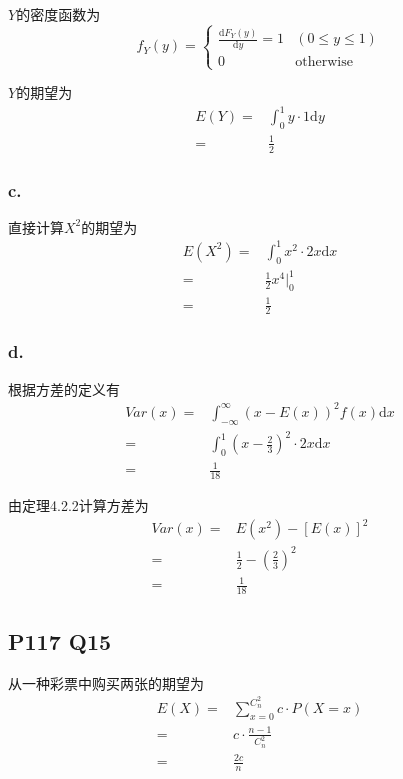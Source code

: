 \documentclass[a4paper,12pt]{ctexart}
\begin{document}
$Y$的密度函数为
\begin{equation*}
	f_Y(y) =
	\begin{cases}
		\frac{\mathrm{d}F_Y(y)}{\mathrm{d}y} = 1 & (0 \leq y \leq 1) \\
		0 & \text{otherwise}
	\end{cases}
\end{equation*}

$Y$的期望为
\begin{align*}
	E(Y) =& \int_{0}^{1} y \cdot 1 \mathrm{d}y \\
	=& \frac{1}{2}
\end{align*}

\subsubsection*{c.}

直接计算$X^2$的期望为
\begin{align*}
	E(X^2) =& \int_{0}^{1} x^2 \cdot 2x \mathrm{d}x \\
	=& \frac{1}{2} x^4 \bigg|_0^1 \\
	=& \frac{1}{2}
\end{align*}

\subsubsection*{d.}

根据方差的定义有
\begin{align*}
	Var(x) =& \int_{-\infty}^{\infty} (x - E(x))^2 f(x) \mathrm{d}x \\
	=& \int_{0}^{1} \left(x - \frac{2}{3}\right)^2 \cdot 2x \mathrm{d}x \\
	=& \frac{1}{18}
\end{align*}

由定理4.2.2计算方差为
\begin{align*}
	Var(x) =& E(x^2) - [E(x)]^2 \\
	=& \frac{1}{2} - \left(\frac{2}{3}\right)^2 \\
	=& \frac{1}{18}
\end{align*}

\subsection*{P117 Q15}

从一种彩票中购买两张的期望为
\begin{align*}
	E(X) =& \sum_{x=0}^{C_n^2} c \cdot P(X = x) \\
	=& c \cdot \frac{n-1}{C_n^2} \\
	=& \frac{2c}{n}
\end{align*}
\end{document}

